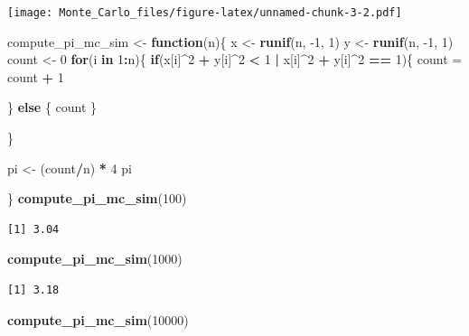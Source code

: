 \documentclass[]{article}
\newenvironment{Shaded}{\begin{snugshade}}{\end{snugshade}}
\newcommand{\ControlFlowTok}[1]{\textcolor[rgb]{0.13,0.29,0.53}{\textbf{#1}}}
\newcommand{\DecValTok}[1]{\textcolor[rgb]{0.00,0.00,0.81}{#1}}
\newcommand{\KeywordTok}[1]{\textcolor[rgb]{0.13,0.29,0.53}{\textbf{#1}}}
\newcommand{\NormalTok}[1]{#1}
\newcommand{\OperatorTok}[1]{\textcolor[rgb]{0.81,0.36,0.00}{\textbf{#1}}}
\newcommand{\StringTok}[1]{\textcolor[rgb]{0.31,0.60,0.02}{#1}}
\begin{document}
\texttt{[image: Monte\_Carlo\_files/figure-latex/unnamed-chunk-3-2.pdf]}

\begin{Shaded}
\begin{Highlighting}[]
\NormalTok{compute_pi_mc_sim <-}\StringTok{ }\ControlFlowTok{function}\NormalTok{(n)\{}
\NormalTok{  x <-}\StringTok{ }\KeywordTok{runif}\NormalTok{(n, }\DecValTok{-1}\NormalTok{, }\DecValTok{1}\NormalTok{)}
\NormalTok{  y <-}\StringTok{ }\KeywordTok{runif}\NormalTok{(n, }\DecValTok{-1}\NormalTok{, }\DecValTok{1}\NormalTok{)}
\NormalTok{  count <-}\StringTok{ }\DecValTok{0}
  \ControlFlowTok{for}\NormalTok{(i }\ControlFlowTok{in} \DecValTok{1}\OperatorTok{:}\NormalTok{n)\{}
    \ControlFlowTok{if}\NormalTok{(x[i]}\OperatorTok{^}\DecValTok{2} \OperatorTok{+}\StringTok{ }\NormalTok{y[i]}\OperatorTok{^}\DecValTok{2} \OperatorTok{<}\StringTok{ }\DecValTok{1} \OperatorTok{|}\StringTok{ }\NormalTok{x[i]}\OperatorTok{^}\DecValTok{2} \OperatorTok{+}\StringTok{ }\NormalTok{y[i]}\OperatorTok{^}\DecValTok{2} \OperatorTok{==}\StringTok{ }\DecValTok{1}\NormalTok{)\{}
\NormalTok{      count =}\StringTok{ }\NormalTok{count }\OperatorTok{+}\StringTok{ }\DecValTok{1}
      
\NormalTok{    \} }\ControlFlowTok{else}\NormalTok{ \{}
\NormalTok{      count}
\NormalTok{    \}}
    
\NormalTok{  \}}
  
\NormalTok{ pi <-}\StringTok{ }\NormalTok{(count}\OperatorTok{/}\NormalTok{n) }\OperatorTok{*}\StringTok{ }\DecValTok{4}
\NormalTok{ pi}
 
\NormalTok{\}}
\KeywordTok{compute_pi_mc_sim}\NormalTok{(}\DecValTok{100}\NormalTok{)}
\end{Highlighting}
\end{Shaded}

\begin{verbatim}
[1] 3.04
\end{verbatim}

\begin{Shaded}
\begin{Highlighting}[]
\KeywordTok{compute_pi_mc_sim}\NormalTok{(}\DecValTok{1000}\NormalTok{)}
\end{Highlighting}
\end{Shaded}

\begin{verbatim}
[1] 3.18
\end{verbatim}

\begin{Shaded}
\begin{Highlighting}[]
\KeywordTok{compute_pi_mc_sim}\NormalTok{(}\DecValTok{10000}\NormalTok{)}
\end{Highlighting}
\end{Shaded}
\end{document}
